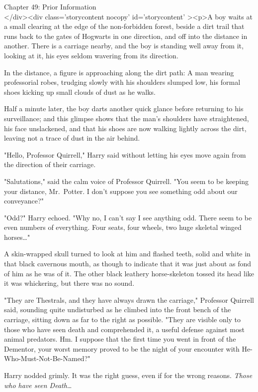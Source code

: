 
Chapter 49: Prior Information\\
</div><div  class='storycontent nocopy' id='storycontent' ><p>A boy waits at a 
small clearing at the edge of the non-forbidden forest, beside a dirt trail 
that runs back to the gates of Hogwarts in one direction, and off into the 
distance in another. There is a carriage nearby, and the boy is standing well 
away from it, looking at it, his eyes seldom wavering from its direction.

In the distance, a figure is approaching along the dirt path: A man wearing 
professorial robes, trudging slowly with his shoulders slumped low, his formal 
shoes kicking up small clouds of dust as he walks.

Half a minute later, the boy darts another quick glance before returning to his 
surveillance; and this glimpse shows that the man's shoulders have 
straightened, his face unslackened, and that his shoes are now walking lightly 
across the dirt, leaving not a trace of dust in the air behind.

"Hello, Professor Quirrell," Harry said without letting his eyes move again 
from the direction of their carriage.

"Salutations," said the calm voice of Professor Quirrell. "You seem to be 
keeping your distance, Mr.~Potter. I don't suppose you see something odd about 
our conveyance?"

"Odd?" Harry echoed. "Why no, I can't say I see anything odd. There seem to be 
even numbers of everything. Four seats, four wheels, two huge skeletal winged 
horses{\ldots}"

A skin-wrapped skull turned to look at him and flashed teeth, solid and white 
in that black cavernous mouth, as though to indicate that it was just about as 
fond of him as he was of it. The other black leathery horse-skeleton tossed its 
head like it was whickering, but there was no sound.

"They are Thestrals, and they have always drawn the carriage," Professor 
Quirrell said, sounding quite undisturbed as he climbed into the front bench of 
the carriage, sitting down as far to the right as possible. "They are visible 
only to those who have seen death and comprehended it, a useful defense against 
most animal predators. Hm. I suppose that the first time you went in front of 
the Dementor, your worst memory proved to be the night of your encounter with 
He-Who-Must-Not-Be-Named?"

Harry nodded grimly. It was the right guess, even if for the wrong reasons. 
\emph{Those who have seen Death{\ldots}}

